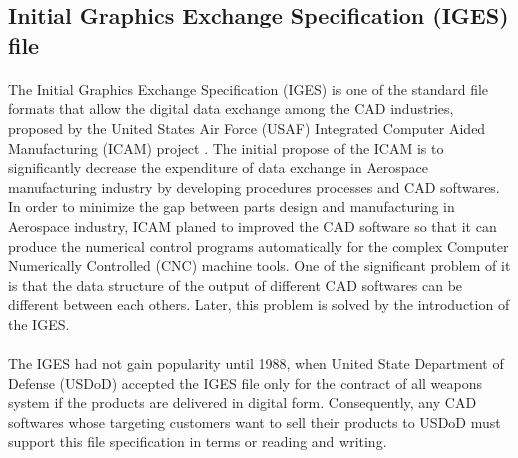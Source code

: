 \subsection{Initial Graphics Exchange Specification (IGES) file}
\label{lr_sec:IGES}
\paragraph{}
The Initial Graphics Exchange Specification (IGES) is one of the standard file formats that allow the digital data exchange among the CAD industries, proposed by the United States Air Force (USAF) Integrated Computer Aided Manufacturing (ICAM) project \cite{uspro2006}.
The initial propose of the ICAM is to significantly decrease the expenditure of data exchange in Aerospace manufacturing industry by developing procedures processes and CAD softwares.
In order to minimize the gap between parts design and manufacturing in Aerospace industry, ICAM planed to improved the CAD software so that it can produce the numerical control programs automatically for the complex Computer Numerically Controlled (CNC) machine tools.
One of the significant problem of it is that the data structure of the output of different CAD softwares can be different between each others.
Later, this problem is solved by the introduction of the IGES.
\paragraph{}
The IGES had not gain popularity until 1988, when United State Department of Defense (USDoD) accepted the IGES file only for the contract of all weapons system if the products are delivered in digital form.
Consequently, any CAD softwares whose targeting customers want to sell their products to USDoD must support this file specification in terms or reading and writing.



